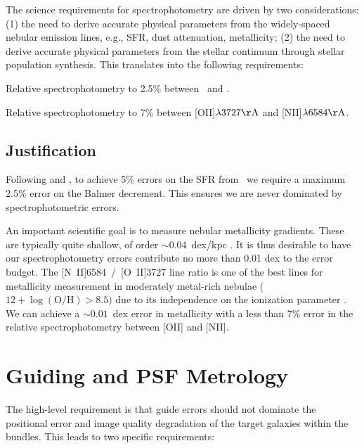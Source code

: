 \documentclass[11pt,a4paper,twoside,onecolumn,openany,final,oldfontcommands]{memoir}
\begin{document}
The science requirements for spectrophotometry are driven by two considerations: (1) the need to derive accurate physical parameters from the widely-spaced nebular emission lines, e.g., SFR, dust attenuation, metallicity; (2) the need to derive accurate physical parameters from the stellar continuum through stellar population synthesis. This translates into the following requirements:

\begin{requirement}

\reqitem Relative spectrophotometry to 2.5\% between \Halpha\ and \Hbeta.
    
\reqitem Relative spectrophotometry to 7\% between [OII]$\lambda3727{\rm \AA}$ and [NII]$\lambda6584{\rm \AA}$. 
    
\end{requirement}

\subsection{Justification}

Following \citet{kennicutt1998} and \citet{calzetti01}, to achieve 5\% errors on the SFR from \Halpha\ we require a maximum 2.5\% error on the Balmer decrement. This ensures we are never dominated by spectrophotometric errors.

An important scientific goal is to measure nebular metallicity gradients. These are typically quite shallow, of order $\sim0.04$~dex/kpc \citep{vanzee1996}. It is thus desirable to have our spectrophotometry errors contribute no more than 0.01 dex to the error budget. The [N~II]6584~/~[O~II]3727 line ratio is one of the best lines for metallicity measurement in moderately metal-rich nebulae ($12 + \log(\mathrm{O/H}) > 8.5)$ due to its independence on the ionization parameter \citep{kewley02}. We can achieve a $\sim0.01$~dex error in metallicity with a less than 7\% error in the relative spectrophotometry between [OII] and [NII].

\section{Guiding and PSF Metrology}
\label{sec:guiding}

The high-level requirement is that guide errors should not dominate the positional error and image quality degradation of the target galaxies within the bundles. This leads to two specific requirements:
\end{document}
